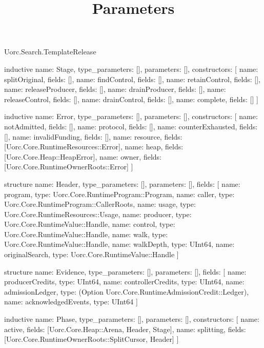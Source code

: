 \begin{lexlean}{Uorc.Search.TemplateRelease}
\title{Parameters}
\begin{semanticmodule}
inductive{
  name: Stage,
  type_parameters: [],
  parameters: [],
  constructors: [
    {name: splitOriginal, fields: []},
    {name: findControl, fields: []},
    {name: retainControl, fields: []},
    {name: releaseProducer, fields: []},
    {name: drainProducer, fields: []},
    {name: releaseControl, fields: []},
    {name: drainControl, fields: []},
    {name: complete, fields: []}
  ]
}

inductive{
  name: Error,
  type_parameters: [],
  parameters: [],
  constructors: [
    {name: notAdmitted, fields: []},
    {name: protocol, fields: []},
    {name: counterExhausted, fields: []},
    {name: invalidFunding, fields: []},
    {name: resource, fields: [Uorc.Core.RuntimeResources::Error]},
    {name: heap, fields: [Uorc.Core.Heap::HeapError]},
    {name: owner, fields: [Uorc.Core.RuntimeOwnerRoots::Error]}
  ]
}

structure{
  name: Header,
  type_parameters: [],
  parameters: [],
  fields: [
    {name: program, type: Uorc.Core.RuntimeProgram::Program},
    {name: caller, type: Uorc.Core.RuntimeProgram::CallerRoots},
    {name: usage, type: Uorc.Core.RuntimeResources::Usage},
    {name: producer, type: Uorc.Core.RuntimeValue::Handle},
    {name: control, type: Uorc.Core.RuntimeValue::Handle},
    {name: walk, type: Uorc.Core.RuntimeValue::Handle},
    {name: walkDepth, type: UInt64},
    {name: originalSearch, type: Uorc.Core.RuntimeValue::Handle}
  ]
}

structure{
  name: Evidence,
  type_parameters: [],
  parameters: [],
  fields: [
    {name: producerCredits, type: UInt64},
    {name: controllerCredits, type: UInt64},
    {name: admissionLedger, type: (Option Uorc.Core.RuntimeAdmissionCredit::Ledger)},
    {name: acknowledgedEvents, type: UInt64}
  ]
}

inductive{
  name: Phase,
  type_parameters: [],
  parameters: [],
  constructors: [
    {name: active, fields: [Uorc.Core.Heap::Arena, Header, Stage]},
    {name: splitting, fields: [Uorc.Core.RuntimeOwnerRoots::SplitCursor, Header]}
  ]
}


\end{semanticmodule}
\end{lexlean}

